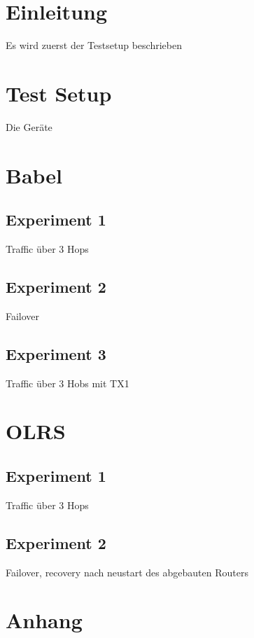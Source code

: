 \documentclass[10pt]{scrartcl}
\author{André Harms, Oliver Steenbuck}
\title{\titletext}
\date{09.11.2011}
\begin{document}
\maketitle

\setcounter{tocdepth}{3}
\tableofcontents

	\listoftables                                 												%
	\listoffigures   

\section{Einleitung}
 Es wird zuerst der Testsetup beschrieben

\section{Test Setup}
	Die Geräte 

\section{Babel}
	\subsection{Experiment 1}
	Traffic über 3 Hops	
	
	\subsection{Experiment 2}
	Failover	
	
	\subsection{Experiment 3}
	Traffic über 3 Hobs mit TX1


\section{OLRS}
	\subsection{Experiment 1}
	Traffic über 3 Hops	
	
	\subsection{Experiment 2}
	Failover, recovery nach neustart des abgebauten Routers


\section{Anhang}
\end{document}
